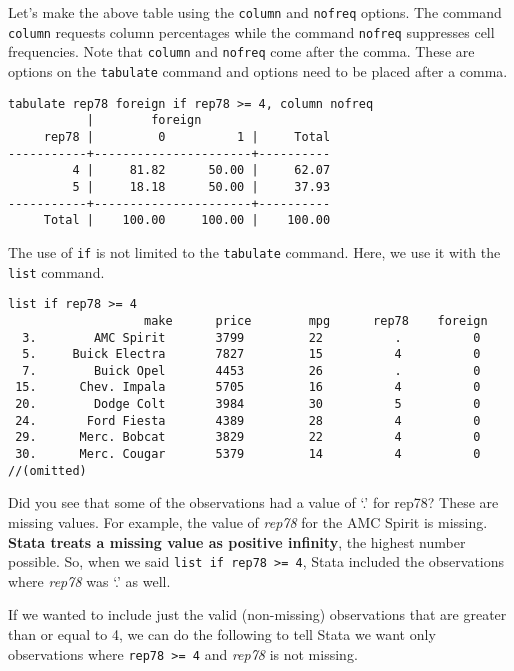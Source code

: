 Let\rq{}s make the above table using the \lstinline{column} and \lstinline{nofreq} options. The command \lstinline{column} requests column percentages while the command \lstinline{nofreq} suppresses cell frequencies. Note that \lstinline{column} and \lstinline{nofreq} come after the comma. These are options on the \lstinline{tabulate} command and options need to be placed after a comma.

\begin{lstlisting}
tabulate rep78 foreign if rep78 >= 4, column nofreq
           |        foreign
     rep78 |         0          1 |     Total
-----------+----------------------+----------
         4 |     81.82      50.00 |     62.07
         5 |     18.18      50.00 |     37.93
-----------+----------------------+----------
     Total |    100.00     100.00 |    100.00
\end{lstlisting}

The use of \lstinline{if} is not limited to the \lstinline{tabulate} command. Here, we use it with the \lstinline{list} command.

\begin{lstlisting}
list if rep78 >= 4
                   make      price        mpg      rep78    foreign
  3.        AMC Spirit       3799         22          .          0
  5.     Buick Electra       7827         15          4          0
  7.        Buick Opel       4453         26          .          0
 15.      Chev. Impala       5705         16          4          0
 20.        Dodge Colt       3984         30          5          0
 24.       Ford Fiesta       4389         28          4          0
 29.      Merc. Bobcat       3829         22          4          0
 30.      Merc. Cougar       5379         14          4          0
//(omitted)
\end{lstlisting}

Did you see that some of the observations had a value of  `.' for rep78? These are missing values. For example, the value of \textit{rep78} for the AMC Spirit is missing. \textbf{Stata treats a missing value as positive infinity}, the highest number possible. So, when we said \lstinline{list if rep78 >= 4}, Stata included the observations where \textit{rep78} was `.' as well.

If we wanted to include just the valid (non-missing) observations that are greater than or equal to 4, we can do the following to tell Stata we want only observations where \lstinline{rep78 >= 4} and \textit{rep78} is not missing.

